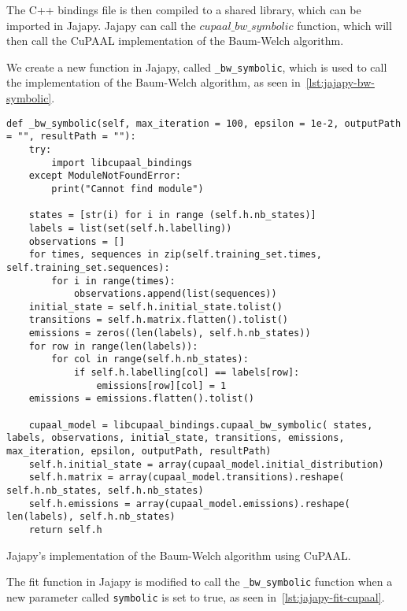 The C++ bindings file is then compiled to a shared library, which can be imported in Jajapy.
Jajapy can call the $cupaal\_bw\_symbolic$ function, which will then call the CuPAAL implementation of the Baum-Welch algorithm.

We create a new function in Jajapy, called \texttt{\_bw\_symbolic}, which is used to call the \Cupaal implementation of the Baum-Welch algorithm, as seen in~\autoref{lst:jajapy-bw-symbolic}.

\begin{listing}[htb!]
    \begin{verbatim}
def _bw_symbolic(self, max_iteration = 100, epsilon = 1e-2, outputPath = "", resultPath = ""):
    try:
        import libcupaal_bindings
    except ModuleNotFoundError:
        print("Cannot find module")

    states = [str(i) for i in range (self.h.nb_states)]
    labels = list(set(self.h.labelling))
    observations = []
    for times, sequences in zip(self.training_set.times, self.training_set.sequences):
        for i in range(times):
            observations.append(list(sequences))
    initial_state = self.h.initial_state.tolist()
    transitions = self.h.matrix.flatten().tolist()
    emissions = zeros((len(labels), self.h.nb_states))
    for row in range(len(labels)):
        for col in range(self.h.nb_states):
            if self.h.labelling[col] == labels[row]:
                emissions[row][col] = 1
    emissions = emissions.flatten().tolist()

    cupaal_model = libcupaal_bindings.cupaal_bw_symbolic( states, labels, observations, initial_state, transitions, emissions, max_iteration, epsilon, outputPath, resultPath)
    self.h.initial_state = array(cupaal_model.initial_distribution)
    self.h.matrix = array(cupaal_model.transitions).reshape( self.h.nb_states, self.h.nb_states)
    self.h.emissions = array(cupaal_model.emissions).reshape( len(labels), self.h.nb_states)
    return self.h
      \end{verbatim}
    \caption{Jajapy's implementation of the Baum-Welch algorithm using CuPAAL.}
    \label{lst:jajapy-bw-symbolic}
\end{listing}

The fit function in Jajapy is modified to call the \texttt{\_bw\_symbolic} function when a new parameter called \texttt{symbolic} is set to true, as seen in~\autoref{lst:jajapy-fit-cupaal}.

